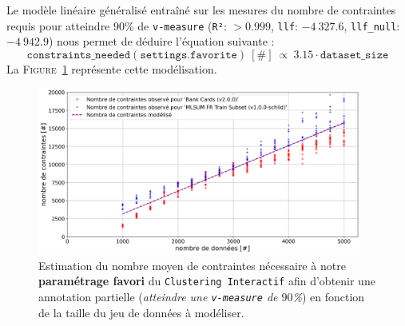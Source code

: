 			Le modèle linéaire généralisé entraîné sur les mesures du nombre de contraintes requis pour atteindre $90$\% de \texttt{v-measure} (\texttt{R²}: $> 0.999$, \texttt{llf}: $-4~327.6$, \texttt{llf\_null}: $-4~942.9$) nous permet de déduire l'équation suivante :
			\begin{equation}
				\label{equation:4.3.3-ETUDE-COUT-NOMBRE-CONTRAINTES}
				\texttt{constraints\_needed}(\texttt{settings.favorite})~[\#]~
				\propto~3.15 \cdot \texttt{dataset\_size}
			\end{equation}
			La \textsc{Figure~\ref{figure:4.3.3-ETUDE-COUT-NOMBRE-CONTRAINTES}} représente cette modélisation.
			\newline
			\begin{figure}[!htb]
				\centering
				\includegraphics[width=0.95\textwidth]{figures/etude-nombre-contraintes-1-modelisation-nombre}
				\caption{
					Estimation du nombre moyen de contraintes nécessaire à notre \textbf{paramétrage favori} du \texttt{Clustering Interactif} afin d'obtenir une annotation partielle (\textit{atteindre une \texttt{v-measure} de $90$\%}) en fonction de la taille du jeu de données à modéliser.
				}
				\label{figure:4.3.3-ETUDE-COUT-NOMBRE-CONTRAINTES}
			\end{figure}
		
